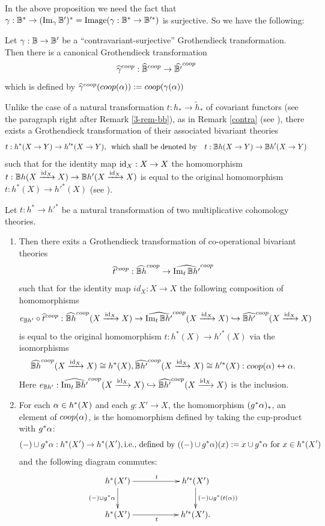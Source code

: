 \documentclass[a4paper]{amsart}
\begin{document}
In the above proposition we need the fact that $\gamma:\mathbb B^* \to (\operatorname{Im}_{\gamma}\mathbb B')^* = \operatorname{Image}(\gamma: \mathbb B^* \to \mathbb B'^*)$ is surjective. So we have the following:
\begin{cor}
Let $\gamma:\mathbb B \to \mathbb B'$ be a ``contravariant-surjective'' Grothendieck transformation. Then there is a canonical Grothendieck transformation
$$\widehat{\gamma}^{coop}: \widehat{\mathbb B}^{coop} \to \widehat{\mathbb B'}^{coop}$$
which is defined by $\widehat{\gamma}^{coop}(coop(\alpha)):= coop(\gamma(\alpha))$
\end{cor}
Unlike the case of a natural transformation $t:h_* \to \tilde h_*$ of covariant functors (see the paragraph right after Remark \ref{3-rem-bb}), 
as in Remark \ref{contra} (see \cite[\S 3.2 ]{FM}), there exists a Grothendieck transformation of their associated bivariant theories
$$t:h^*(X \to Y) \to h'^*(X \to Y), \text{\, which shall be denoted by} \quad t:\mathbb B h(X \to Y) \to \mathbb B h'(X \to Y)$$
such that for the identity map $\operatorname{id}_X: X \to X$ the homomorphism $t:\mathbb B h(X \xrightarrow {\operatorname{id}_X} X) \to \mathbb B h'(X \xrightarrow {\operatorname{id}_X} X) $ is equal to the original homomorphism $t: h^*(X) \to h'^*(X)$ (see \cite[\S 3.1.7]{FM}). 
\begin{thm}\label{thh'} Let $t: h^* \to h'^*$ be a natural transformation of two multiplicative cohomology theories. 
\begin{enumerate}
\item Then there exits a Grothendieck transformation of co-operational bivariant theories
$$\widehat t^{coop}: \widehat{\mathbb B h}^{coop} \to \widehat{\operatorname{Im}_t\mathbb B h'}^{coop}$$
such that for the identity map $id_X:X \to X$ the following composition of homomorphisms
$$e_{\mathbb B h'} \circ \widehat t^{coop}:\widehat{\mathbb B h}^{coop} (X \xrightarrow {\operatorname{id}_X} X)  \to \widehat{\operatorname{Im}_t \mathbb B h'}^{coop}(X \xrightarrow {\operatorname{id}_X} X) \hookrightarrow \widehat{\mathbb B h'}^{coop} (X \xrightarrow {\operatorname{id}_X} X) $$
 is equal to the original homomorphism  $t: h^*(X) \to h'^*(X)$ 
via the isomorphisms 
$$\widehat{\mathbb B h}^{coop} (X \xrightarrow {\operatorname{id}_X} X) \cong h^*(X), \widehat{\mathbb B h'}^{coop} (X \xrightarrow {\operatorname{id}_X} X) \cong h'^*(X): coop(\alpha) \leftrightarrow \alpha.$$ 
Here $e_{\mathbb B h'} : \widehat{\operatorname{Im}_t \mathbb B h'}^{coop}(X \xrightarrow {\operatorname{id}_X} X) \hookrightarrow \widehat{\mathbb B h'}^{coop} (X \xrightarrow {\operatorname{id}_X} X) $ is the inclusion.
\item For each $\alpha \in h^*(X)$ and each $g:X' \to X$, the homomorphism $(g^*\alpha)_*$, an element of $coop(\alpha)$, is the homomorphism defined by taking the cup-product with $g^*\alpha$:
$$ (-)\cup g^*\alpha: h^*(X') \to h^*(X'), \text{i.e., defined by $((-) \cup g^*\alpha)(x):= x \cup g^*\alpha$ for $x \in h^*(X')$}$$
and the following diagram commutes:
\begin{equation}\label{cd-cup}
\xymatrix
{
h^*(X') \ar[rr]^t \ar[d]_{(-) \cup g^*\alp} && h'^*(X') \ar[d]^{(-) \cup g^*(t(\alp))} \\
h^*(X')\ar[rr]_{t} && h'^*(X').
}
\end{equation}
\end{enumerate}
 \end{thm}
\end{document}

